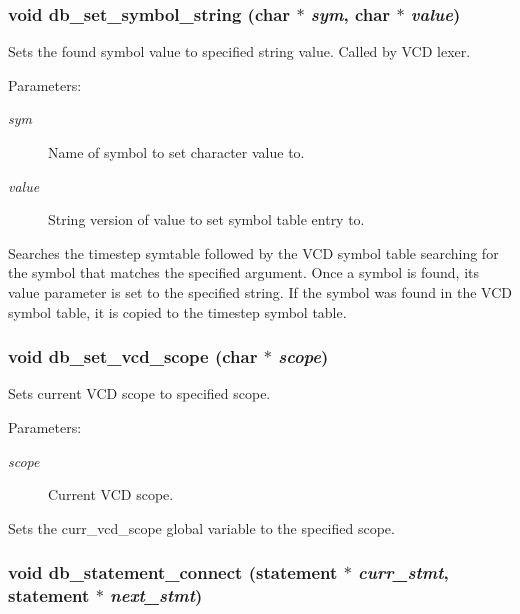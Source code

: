 \subsubsection{\setlength{\rightskip}{0pt plus 5cm}void db\_\-set\_\-symbol\_\-string (char $\ast$ {\em sym}, char $\ast$ {\em value})}\label{db_8c_a33}


Sets the found symbol value to specified string value. Called by VCD lexer.

\begin{Desc}
\item[Parameters: ]\par
\begin{description}
\item[{\em 
sym}]Name of symbol to set character value to. \item[{\em 
value}]String version of value to set symbol table entry to.\end{description}
\end{Desc}
Searches the timestep symtable followed by the VCD symbol table searching for the symbol that matches the specified argument. Once a symbol is found, its value parameter is set to the specified string. If the symbol was found in the VCD symbol table, it is copied to the timestep symbol table. 
\subsubsection{\setlength{\rightskip}{0pt plus 5cm}void db\_\-set\_\-vcd\_\-scope (char $\ast$ {\em scope})}\label{db_8c_a29}


Sets current VCD scope to specified scope.

\begin{Desc}
\item[Parameters: ]\par
\begin{description}
\item[{\em 
scope}]Current VCD scope.\end{description}
\end{Desc}
Sets the curr\_\-vcd\_\-scope global variable to the specified scope. 
\subsubsection{\setlength{\rightskip}{0pt plus 5cm}void db\_\-statement\_\-connect ({\bf statement} $\ast$ {\em curr\_\-stmt}, {\bf statement} $\ast$ {\em next\_\-stmt})}\label{db_8c_a27}


